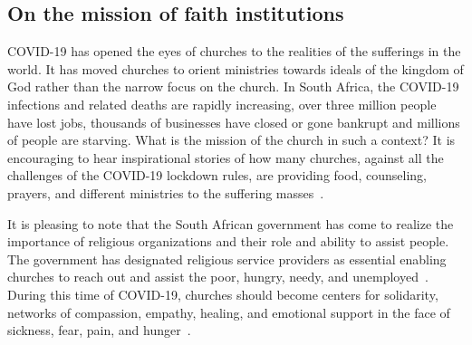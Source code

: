 \subsection{On the mission of faith institutions}
COVID-19 has opened the eyes of churches to the realities of the sufferings in the world. It has moved churches to orient ministries towards ideals of the kingdom of God rather than the narrow focus on the church. In South Africa, the COVID-19 infections and related deaths are rapidly increasing, over three million people have lost jobs, thousands of businesses have closed or gone bankrupt and millions of people are starving. What is the mission of the church in such a context? It is encouraging to hear inspirational stories of how many churches, against all the challenges of the COVID-19 lockdown rules, are providing food, counseling, prayers, and different ministries to the suffering masses~\cite{jerry:pillay}.

It is pleasing to note that the South African government has come to realize the importance of religious organizations and their role and ability to assist people. The government has designated religious service providers as essential enabling churches to reach out and assist the poor, hungry, needy, and unemployed~\cite{jerry:pillay}. During this time of COVID-19, churches should become centers for solidarity, networks of
compassion, empathy, healing, and emotional support in the face of sickness, fear, pain, and hunger~\cite{jerry:pillay}.

